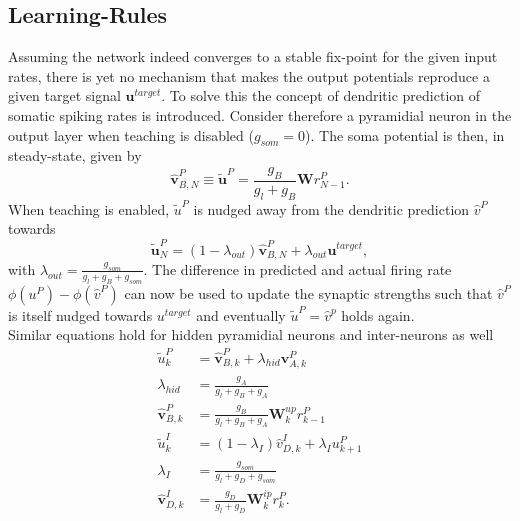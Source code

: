 \documentclass[12pt,a4paper]{article}
\begin{document}
\subsection{Learning-Rules}
Assuming the network indeed converges to a stable fix-point for the given input rates, there is yet no mechanism that makes the output potentials reproduce a given target signal $\bm{u}^{target}$. To solve this the concept of dendritic prediction of somatic spiking rates is introduced. Consider therefore a pyramidial neuron in the output layer when teaching is disabled ($g_{som}=0$). The soma potential is then, in steady-state, given by
\begin{equation}
\hat{\bm{v}}^P_{B,N} \equiv \tilde{\bm{u}}^P = \frac{g_B}{g_l + g_B}\bm{W}r^P_{N-1}.
\end{equation} 
When teaching is enabled, $\tilde{u}^P$ is nudged away from the dendritic prediction $\hat{v}^P$ towards
\begin{equation}
\tilde{\bm{u}}^P_N = (1-\lambda_{out})\hat{\bm{v}}^P_{B,N} + \lambda_{out}\bm{u}^{target},\label{eq:out_stead}
\end{equation}
with $\lambda_{out} = \frac{g_{som}}{g_l + g_B + g_{som}}$.
The difference in predicted and actual firing rate $\phi(u^P) - \phi(\hat{v}^P)$ can now be used to update the synaptic strengths such that $\hat{v}^P$ is itself nudged towards $u^{target}$ and eventually $\tilde{u}^P = \hat{v}^p$ holds again.\\
Similar equations hold for hidden pyramidial neurons and inter-neurons as well
\begin{align}
\tilde{u}^P_k &= \hat{\bm{v}}^P_{B,k} + \lambda_{hid}\bm{v}^P_{A,k}\\ \lambda_{hid} &= \frac{g_A}{g_l + g_B + g_A}\\
\hat{\bm{v}}^P_{B,k} &= \frac{g_B}{g_l + g_B + g_A}\bm{W}^{up}_kr^P_{k-1}\label{eq:basal_pyr}\\
\tilde{u}^I_k &= (1-\lambda_I)\hat{v}^I_{D,k} + \lambda_{I}u^P_{k+1}\\ \lambda_{I} &= \frac{g_{som}}{g_l + g_D + g_{som}}\\
\hat{\bm{v}}^I_{D,k} &= \frac{g_D}{g_l + g_D}\bm{W}^{ip}_kr^P_k \label{eq:dend_int}.
\end{align}
\end{document}
